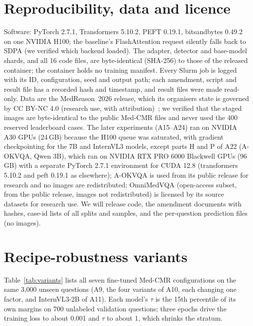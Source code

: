 \section{Reproducibility, data and licence}
\label{app:repro}

Software: PyTorch 2.7.1, Transformers 5.10.2, PEFT 0.19.1, bitsandbytes 0.49.2 on one NVIDIA H100; the baseline's FlashAttention request silently falls back to SDPA (we verified which backend loaded).
The adapter, detector and base-model shards, and all 16 code files, are byte-identical (SHA-256) to those of the released container; the container holds no training manifest.
Every Slurm job is logged with its ID, configuration, seed and output path; each amendment, script and result file has a recorded hash and timestamp, and result files were made read-only.
Data are the MedReason~2026 release, which its organisers state is governed by CC BY-NC 4.0 (research use, with attribution)~\cite{medreason2026}; we verified that the staged images are byte-identical to the public Med-CMR files and never used the 400 reserved leaderboard cases.
The later experiments (A15--A24) ran on NVIDIA A30 GPUs (24\,GB) because the H100 queue was saturated, with gradient checkpointing for the 7B and InternVL3 models, except parts H and P of A22 (A-OKVQA, Qwen 3B), which ran on NVIDIA RTX PRO 6000 Blackwell GPUs (96\,GB) with a separate PyTorch 2.7.1 environment for CUDA 12.8 (transformers 5.10.2 and peft 0.19.1 as elsewhere); A-OKVQA is used from its public release for research and no images are redistributed; OmniMedVQA (open-access subset, from the public release, images not redistributed) is licensed by its source datasets for research use.
We will release code, the amendment documents with hashes, case-id lists of all splits and samples, and the per-question prediction files (no images).

\section{Recipe-robustness variants}
\label{app:variants}

Table~\ref{tab:variants} lists all seven fine-tuned Med-CMR configurations on the same 3{,}000 unseen questions (A9, the four variants of A10, each changing one factor, and InternVL3-2B of A11).
Each model's $\tau$ is the 15th percentile of its own margins on 700 unlabeled validation questions; three epochs drive the training loss to about 0.001 and $\tau$ to about 1, which shrinks the \LO{} stratum.

